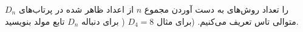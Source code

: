 \EXERCISE
$D_n$
را تعداد روش‌های به دست آوردن مجموع
$n$
از اعداد ظاهر شده در پرتاب‌های متوالی تاس تعریف می‌کنیم. (برای مثال
$D_4 = 8$
(
برای دنباله
$D_n$
تابع مولد بنویسید.